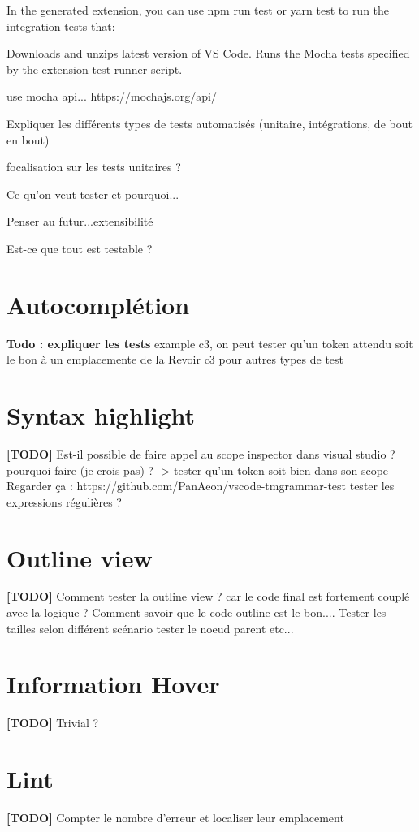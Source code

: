 \documentclass[
    iict, %
    il, %
]{heig-tb}
\begin{document}
In the generated extension, you can use npm run test or yarn test to run the integration tests that:

Downloads and unzips latest version of VS Code.
Runs the Mocha tests specified by the extension test runner script.

use mocha api...
https://mochajs.org/api/


Expliquer les différents types de tests automatisés (unitaire, intégrations, de bout en bout)

focalisation sur les tests unitaires ?

Ce qu'on veut tester et pourquoi...

Penser au futur...extensibilité

Est-ce que tout est testable ?


\section{Autocomplétion}
\textbf{Todo : expliquer les tests}
example c3, on peut tester qu'un token attendu soit le bon à un emplacemente de la
Revoir c3 pour autres types de test

\section{Syntax highlight}
\textbf{[TODO]}
Est-il possible de faire appel au scope inspector dans visual studio ? pourquoi faire (je crois pas) ? -> tester qu'un token soit bien dans son scope
Regarder ça : https://github.com/PanAeon/vscode-tmgrammar-test
tester les expressions régulières ?


\section{Outline view}
\textbf{[TODO]}
Comment tester la outline view ? car le code final est fortement couplé avec la logique ?
Comment savoir que le code outline est le bon....
Tester les tailles selon différent scénario
tester le noeud parent etc...


\section{Information Hover}
\textbf{[TODO]}
Trivial ?

\section{Lint}
\textbf{[TODO]}
Compter le nombre d'erreur et localiser leur emplacement
\end{document}
